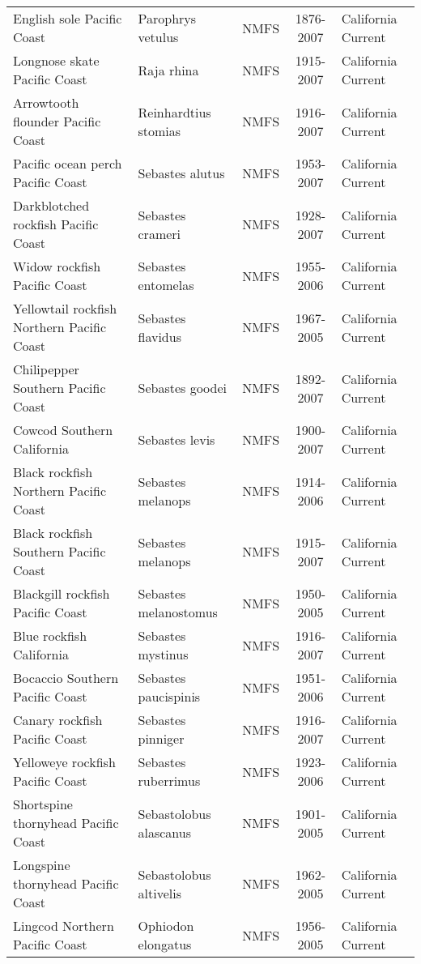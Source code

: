 \begin{longtable}{p{4cm}p{3.5cm}ccp{5.5cm}}
  English sole Pacific Coast & Parophrys vetulus & NMFS & 1876-2007 & California Current \\ 
  Longnose skate Pacific Coast & Raja rhina & NMFS & 1915-2007 & California Current \\ 
  Arrowtooth flounder Pacific Coast & Reinhardtius stomias & NMFS & 1916-2007 & California Current \\ 
  Pacific ocean perch Pacific Coast & Sebastes alutus & NMFS & 1953-2007 & California Current \\ 
  Darkblotched rockfish Pacific Coast & Sebastes crameri & NMFS & 1928-2007 & California Current \\ 
  Widow rockfish Pacific Coast & Sebastes entomelas & NMFS & 1955-2006 & California Current \\ 
  Yellowtail rockfish Northern Pacific Coast & Sebastes flavidus & NMFS & 1967-2005 & California Current \\ 
  Chilipepper Southern Pacific Coast & Sebastes goodei & NMFS & 1892-2007 & California Current \\ 
  Cowcod Southern California & Sebastes levis & NMFS & 1900-2007 & California Current \\ 
  Black rockfish Northern Pacific Coast & Sebastes melanops & NMFS & 1914-2006 & California Current \\ 
  Black rockfish Southern Pacific Coast & Sebastes melanops & NMFS & 1915-2007 & California Current \\ 
  Blackgill rockfish  Pacific Coast & Sebastes melanostomus & NMFS & 1950-2005 & California Current \\ 
  Blue rockfish California & Sebastes mystinus & NMFS & 1916-2007 & California Current \\ 
  Bocaccio Southern Pacific Coast & Sebastes paucispinis & NMFS & 1951-2006 & California Current \\ 
  Canary rockfish Pacific Coast & Sebastes pinniger & NMFS & 1916-2007 & California Current \\ 
  Yelloweye rockfish Pacific Coast & Sebastes ruberrimus & NMFS & 1923-2006 & California Current \\ 
  Shortspine thornyhead Pacific Coast & Sebastolobus alascanus & NMFS & 1901-2005 & California Current \\ 
  Longspine thornyhead Pacific Coast & Sebastolobus altivelis & NMFS & 1962-2005 & California Current \\ 
  Lingcod Northern Pacific Coast & Ophiodon elongatus & NMFS & 1956-2005 & California Current \\ 

\end{longtable}
